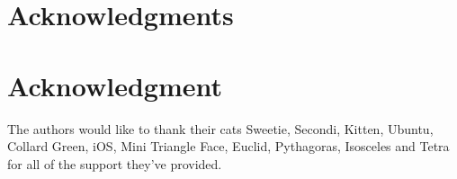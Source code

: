 \documentclass[10pt,journal,compsoc]{IEEEtran}
\begin{document}


%

\ifCLASSOPTIONcompsoc
  \section*{Acknowledgments}
\else
  \section*{Acknowledgment}
\fi


The authors would like to thank their cats Sweetie, Secondi, Kitten, Ubuntu, Collard Green, iOS, Mini Triangle Face, Euclid, Pythagoras, Isosceles and Tetra for all of the support they've provided.








\ifCLASSOPTIONcaptionsoff
  \newpage
\fi



\end{document}
